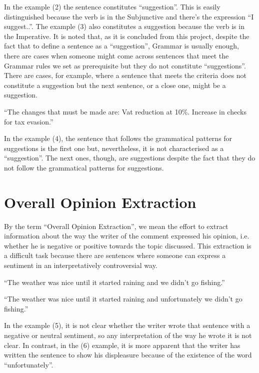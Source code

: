 In the example (2) the sentence constitutes  ``suggestion''. This is easily distinguished because the verb is in the Subjunctive and there's the expression ``I suggest..''. The example (3) also constitutes a suggestion because the verb is in the Imperative. It is noted that, as it is concluded from this project, despite the fact that to define a sentence as a ``suggestion'', Grammar is usually enough, there are cases when someone might come across sentences that meet the Grammar rules we set as prerequisite but they do not constitute  ``suggestions''. There are cases, for example, where a sentence that meets the criteria does not constitute a suggestion but the next sentence, or a close one, might be a suggestion.\\
\begin{example}
	``The changes that must be made are: Vat reduction at 10\%. Increase in checks for tax evasion.''\\
\end{example}
In the example (4), the sentence that follows the grammatical patterns for suggestions is the first one but, nevertheless, it is not characterised as a ``suggestion''. The next ones, though, are suggestions despite the fact that they do not follow the grammatical patterns for suggestions.





\section{Overall Opinion Extraction}
By the term  ``Overall Opinion Extraction'', we mean the effort to extract information about the way the writer of the comment expressed  his opinion, i.e. whether he is negative or positive towards the topic discussed. This extraction is a difficult task because there are sentences where someone can express a sentiment in an interpretatively controversial way.\\
\begin{example}
	``The weather was nice until it started raining and we didn't go fishing.''\\
\end{example}
\begin{example}
	``The weather was nice until it started raining and unfortunately we didn't go fishing.''\\
\end{example}
In the example (5), it is not clear whether the writer wrote that sentence with a negative or neutral sentiment, so any interpretation of the way he wrote it is not clear. In contrast, in the (6) example, it is more apparent that the writer has written the sentence to show his displeasure because of the existence of the word ``unfortunately''.